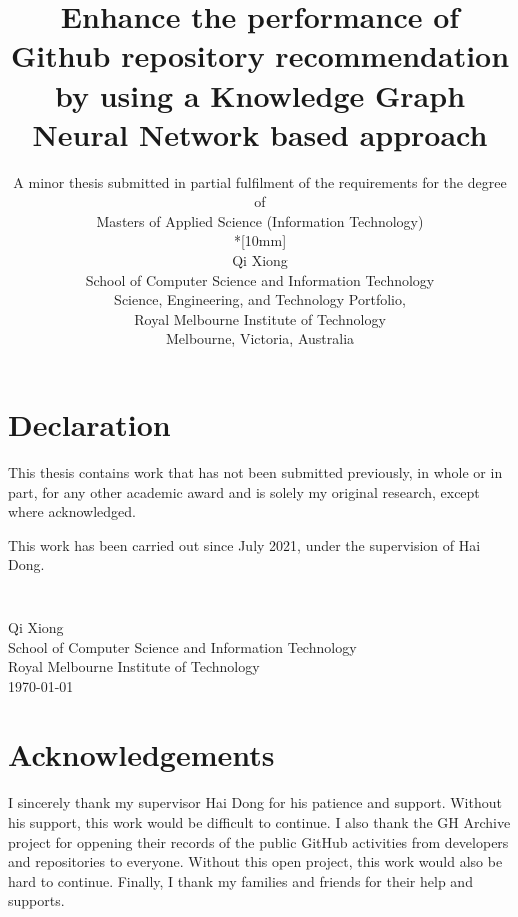 \documentclass[11pt,twoside]{report}
\newcommand{\SubmissionDate}{\today}
\newcommand{\student}{Qi Xiong}
\newcommand{\supervisor}{Hai Dong}
\newcommand{\topic}{Enhance the performance of Github repository recommendation by using a Knowledge Graph Neural Network based approach}
\newcommand{\school}{School of Computer Science and Information Technology}
\newcommand{\program}{Masters of Applied Science (Information Technology)}
\newcommand{\institution}{Royal Melbourne Institute of Technology}
\begin{document}
\title{{\Large\bf \topic}}
\author{
A minor thesis submitted in partial fulfilment of the requirements for the degree of
\\\program\\*[10mm]
\\\student
\\\school
\\Science, Engineering, and Technology Portfolio,
\\\institution
\\Melbourne, Victoria, Australia
}
\maketitle
\thispagestyle{empty}

\chapter*{Declaration}

This thesis contains work that has not been submitted previously, in
whole or in part, for any other academic award and is solely my
original research, except where acknowledged.

This work has been carried out since July 2021, under the
supervision of {\supervisor}.

\paragraph{}
\vspace{5cm}\noindent \\\student \\
\school\\
\institution\\
\SubmissionDate


\chapter*{Acknowledgements}

I sincerely thank my supervisor Hai Dong for his patience and support. Without his support, this work would be difficult to continue. I also thank the GH Archive project for oppening their records of the public GitHub activities from developers and repositories to everyone. Without this open project, this work would also be hard to continue. Finally, I thank my families and friends for their help and supports.
\end{document}
